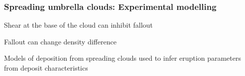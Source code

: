 \documentclass{beamer}
\begin{document}
\begin{frame}
  \frametitle{Spreading umbrella clouds: Experimental modelling}



  \vspace{0.5cm}
  
  Shear at the base of the cloud can inhibit fallout \\

  \vspace{0.5cm}
  
  Fallout can change density difference \\

  \vspace{0.5cm}
  
  Models of deposition from spreading clouds used to infer eruption parameters from deposit characteristics \\
  
\end{frame}
\end{document}
